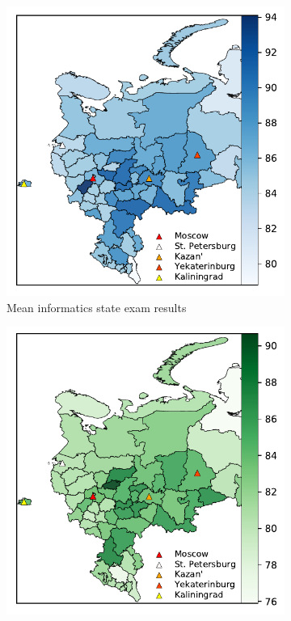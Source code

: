 \documentclass{article}
\begin{document}
\begin{figure}[h!]
  \centering 
  \begin{subfigure}{0.49\textwidth}
    \includegraphics[width=\linewidth]{../gfx/map_informatics.pdf}
    \caption{Mean informatics state exam results}
    \label{fig:mapinf}
  \end{subfigure} 
  \begin{subfigure}{0.49\textwidth}
    \includegraphics[width=\linewidth]{../gfx/map_math.pdf}

\end{subfigure}
\end{figure}
\end{document}

